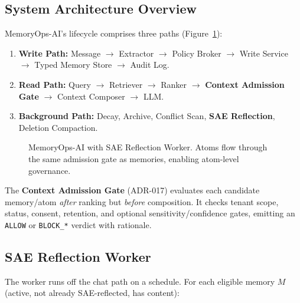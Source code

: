 \documentclass[11pt]{article}
\begin{document}
\subsection{System Architecture Overview}
\label{sec:arch}

MemoryOps-AI's lifecycle comprises three paths (Figure~\ref{fig:arch}):

\begin{enumerate}
  \item \textbf{Write Path:} Message $\to$ Extractor $\to$ Policy Broker $\to$ Write Service $\to$ Typed Memory Store $\to$ Audit Log.
  \item \textbf{Read Path:} Query $\to$ Retriever $\to$ Ranker $\to$ \textbf{Context Admission Gate} $\to$ Context Composer $\to$ LLM.
  \item \textbf{Background Path:} Decay, Archive, Conflict Scan, \textbf{SAE Reflection}, Deletion Compaction.
\end{enumerate}

\begin{figure}[t]
  \centering
  \caption{MemoryOps-AI with SAE Reflection Worker. Atoms flow through the same admission gate as memories, enabling atom-level governance.}
  \label{fig:arch}
\end{figure}

The \textbf{Context Admission Gate} (ADR-017) evaluates each candidate memory/atom \emph{after} ranking but \emph{before} composition. It checks tenant scope, status, consent, retention, and optional sensitivity/confidence gates, emitting an \texttt{ALLOW} or \texttt{BLOCK\_*} verdict with rationale.

\subsection{SAE Reflection Worker}
\label{sec:sae_worker}

The worker runs off the chat path on a schedule. For each eligible memory $M$ (active, not already SAE-reflected, has content):
\end{document}
